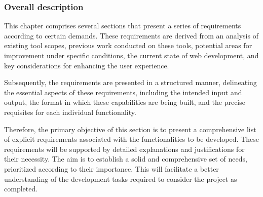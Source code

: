 \subsubsection{Overall description}\label{overall-description}

This chapter comprises several sections that present a series of
requirements according to certain demands. These requirements are
derived from an analysis of existing tool scopes, previous work
conducted on these tools, potential areas for improvement under specific
conditions, the current state of web development, and key considerations
for enhancing the user experience.

Subsequently, the requirements are presented in a structured manner,
delineating the essential aspects of these requirements, including the
intended input and output, the format in which these capabilities are
being built, and the precise requisites for each individual
functionality.

Therefore, the primary objective of this section is to present a
comprehensive list of explicit requirements associated with the
functionalities to be developed. These requirements will be supported by
detailed explanations and justifications for their necessity. The aim is
to establish a solid and comprehensive set of needs, prioritized
according to their importance. This will facilitate a better
understanding of the development tasks required to consider the project
as completed.
